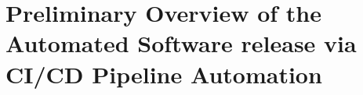 \newpage
\setcounter{section}{0}
\part{Preliminary Overview of the Automated Software release via CI/CD Pipeline Automation}\label{sec:part_1}



